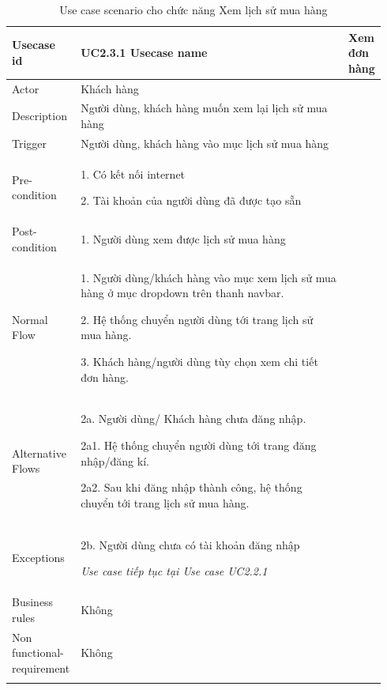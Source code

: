 \begin{longtable}{|>{\hspace{0pt}}m{0.163\linewidth}|>{\hspace{0pt}}m{0.779\linewidth}|} 
\hline
Usecase id & UC2.3.1 \endfirsthead 
\hline
Usecase name & Xem đơn hàng \\ 
\hline
Actor & Khách hàng\\ 
\hline
Description & Người dùng, khách hàng muốn xem lại lịch sử mua hàng \\ 
\hline
Trigger & Người dùng, khách hàng vào mục lịch sử mua hàng~ \\ 
\hline
Pre-condition & 1. Có kết nối internet\par{}2. Tài khoản của người dùng đã được tạo sẵn \\ 
\hline
Post-condition & 1. Người dùng xem được lịch sử mua hàng \\ 
\hline
Normal Flow & 1. Người dùng/khách hàng vào mục xem lịch sử mua hàng ở mục dropdown trên thanh navbar.
\par{}2. Hệ thống chuyển người dùng tới trang lịch sử mua hàng.
\par{}3. Khách hàng/người dùng tùy chọn xem chi tiết đơn hàng.
 
\\ 
\hline
Alternative Flows & 
\par{}2a. Người dùng/ Khách hàng chưa đăng nhập.
\par{}2a1. Hệ thống chuyển người dùng tới trang đăng nhập/đăng kí.
\par{}2a2. Sau khi đăng nhập thành công, hệ thống chuyển tới trang lịch sử mua hàng.
\\ 
\hline
Exceptions & 
2b. Người dùng chưa có tài khoản đăng nhập
\par{}\textit{Use case tiếp tục tại Use case UC2.2.1}
\\
\hline
Business rules & Không \\ 
\hline
Non functional-requirement & Không \\ 
\hline
\caption{Use case scenario cho chức năng Xem lịch sử mua hàng}
\end{longtable}



